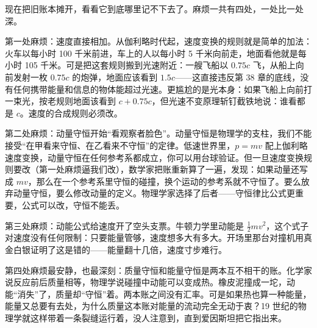 
\begin{mainline}
现在把旧账本摊开，看看它到底哪里记不下去了。麻烦一共有四处，一处比一处深。

第一处麻烦：速度直接相加。从伽利略时代起，速度变换的规则就是简单的加法：火车以每小时 100 千米前进，车上的人以每小时 5 千米向前走，地面看他就是每小时 105 千米。可是把这套规则搬到光速附近：一艘飞船以 \(0.75c\) 飞，从船上向前发射一枚 \(0.75c\) 的炮弹，地面应该看到 \(1.5c\)——这直接违反第 38 章的底线，没有任何携带能量和信息的物体能超过光速。更尴尬的是光本身：如果飞船上向前打一束光，按老规则地面该看到 \(c+0.75c\)，但光速不变原理斩钉截铁地说：谁看都是 \(c\)。速度的合成规则必须改。

第二处麻烦：动量守恒开始“看观察者脸色”。动量守恒是物理学的支柱，我们不能接受“在甲看来守恒、在乙看来不守恒”的定律。低速世界里，\(p=mv\) 配上伽利略速度变换，动量守恒在任何参考系都成立，你可以用台球验证。但一旦速度变换规则要改（第一处麻烦逼我们改），数学家把账重新算了一遍，发现：如果动量还写成 \(mv\)，那么在一个参考系里守恒的碰撞，换个运动的参考系就不守恒了。要么放弃动量守恒，要么修改动量的定义。物理学家选择了后者——守恒律比公式更重要，公式可以改，守恒不能丢。

第三处麻烦：动能公式给速度开了空头支票。牛顿力学里动能是 \(\tfrac12 mv^{2}\)，这个式子对速度没有任何限制：只要能量管够，速度想多大有多大。开场里那台对撞机用真金白银证明了这是错的——能量翻十几倍，速度寸步难行。

第四处麻烦最安静，也最深刻：质量守恒和能量守恒是两本互不相干的账。化学家说反应前后质量相等，物理学说碰撞中动能可以变成热。橡皮泥撞成一坨，动能“消失”了，质量却“守恒”着。两本账之间没有汇率。可是如果热也算一种能量，能量又总要有去处，为什么质量这本账对能量的流动完全无动于衷？19 世纪的物理学就这样带着一条裂缝运行着，没人注意到，直到爱因斯坦把它指出来。
\end{mainline}


